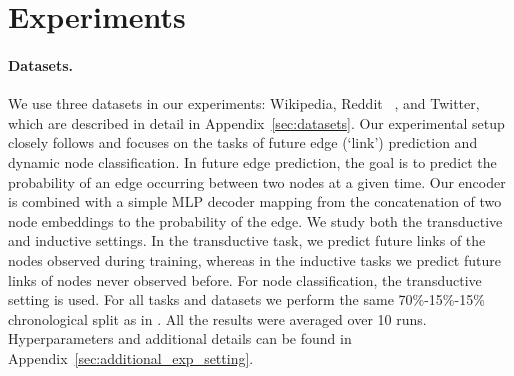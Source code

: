 \documentclass{article}
\begin{document}
\section{Experiments} \label{sec:experiments}


\paragraph{Datasets.} 
We use three datasets in our experiments: Wikipedia, Reddit ~\citep{10.1145/3292500.3330895}, and Twitter, which are described in detail in Appendix~\ref{sec:datasets}.
%
Our experimental setup closely follows \citep{Xu2020Inductive} and focuses on the tasks of future edge (`link') prediction and dynamic node classification. 
%
In future edge prediction, the goal is to predict the probability of an edge occurring between two nodes at a given time. Our encoder is combined with a simple MLP decoder mapping from the concatenation of two node embeddings to the probability of the edge. We study both the transductive and inductive settings. In the transductive task, we predict future links of the nodes observed during training, whereas in the inductive tasks we predict future links of nodes never observed before. 
%
For node classification, the transductive setting is used.
%
For all tasks and datasets we perform the same 70\%-15\%-15\% chronological split as in \citet{Xu2020Inductive}. 
%
All the results were averaged over 10 runs. 
%
Hyperparameters and additional details can be found in Appendix~\ref{sec:additional_exp_setting}.




\end{document}
